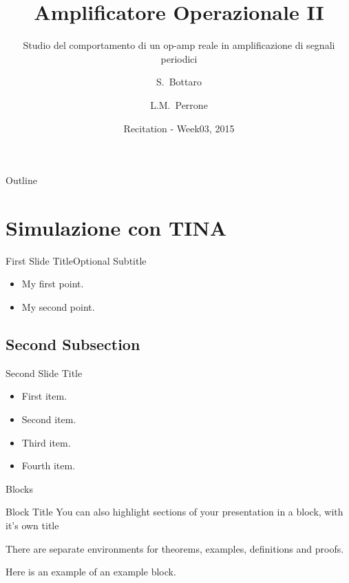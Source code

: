 \documentclass{beamer}
\title{Amplificatore Operazionale II}
\subtitle{Studio del comportamento di un op-amp reale in amplificazione di segnali periodici}
\author{S.~Bottaro\inst{1} \and L.M.~Perrone\inst{1}}
\institute[Unipi] %
{
  \inst{1}%
  Dipartimento di Fisica\\
  Universita' di Pisa
}
\date{Recitation - Week03, 2015}
\begin{document}
\begin{frame}
  \titlepage
\end{frame}

\begin{frame}{Outline}
  \tableofcontents
\end{frame}

\section{Simulazione con TINA}


\begin{frame}{First Slide Title}{Optional Subtitle}
  \begin{itemize}
  \item {
    My first point.
  }
  \item {
    My second point.
  }
  \end{itemize}
\end{frame}

\subsection{Second Subsection}

\begin{frame}{Second Slide Title}
  \begin{itemize}
  \item {
    First item.
    \pause %
  }
  \item {   
    Second item.
  }
  \item<3-> {
    Third item.
  }
  \item<4-> {
    Fourth item.
  }
  \end{itemize}
\end{frame}


\begin{frame}{Blocks}
\begin{block}{Block Title}
You can also highlight sections of your presentation in a block, with it's own title
\end{block}
\begin{theorem}
There are separate environments for theorems, examples, definitions and proofs.
\end{theorem}
\begin{example}
Here is an example of an example block.
\end{example}
\end{frame}
\end{document}
